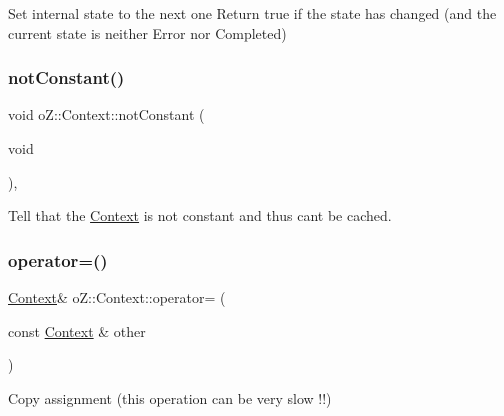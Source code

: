 Set internal state to the next one Return true if the state has changed (and the current state is neither Error nor Completed) 

\mbox{\label{classo_z_1_1_context_ada521ec57fbc2febfd61177e8bbc0128}} 
\subsubsection{\texorpdfstring{notConstant()}{notConstant()}}
{\footnotesize\ttfamily void o\+Z\+::\+Context\+::not\+Constant (\begin{DoxyParamCaption}\item[{void}]{ }\end{DoxyParamCaption})\hspace{0.3cm}{\ttfamily [inline]}, {\ttfamily [noexcept]}}



Tell that the \mbox{\hyperlink{classo_z_1_1_context}{Context}} is not constant and thus can\textquotesingle{}t be cached. 

\mbox{\label{classo_z_1_1_context_a85f1c7d649bb381f267383360b02b876}} 
\subsubsection{\texorpdfstring{operator=()}{operator=()}\hspace{0.1cm}{\footnotesize\ttfamily [1/2]}}
{\footnotesize\ttfamily \mbox{\hyperlink{classo_z_1_1_context}{Context}}\& o\+Z\+::\+Context\+::operator= (\begin{DoxyParamCaption}\item[{const \mbox{\hyperlink{classo_z_1_1_context}{Context}} \&}]{other }\end{DoxyParamCaption})\hspace{0.3cm}{\ttfamily [default]}}



Copy assignment (this operation can be very slow !!) 

\mbox{\label{classo_z_1_1_context_a8167016ce7db8d884383b113bb678736}} 
